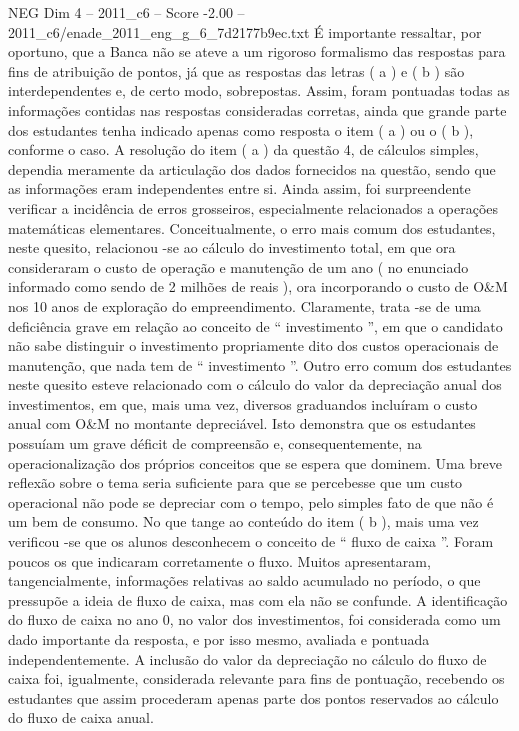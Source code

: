 \begin{textsample}{NEG Dim 4 – 2011\_c6 – Score -2.00 – 2011\_c6/enade\_2011\_eng\_g\_6\_7d2177b9ec.txt}
É importante ressaltar, por oportuno, que a Banca não se ateve a um rigoroso formalismo das respostas para fins de atribuição de pontos, já que as respostas das letras ( a ) e ( b ) são interdependentes e, de certo modo, sobrepostas.
Assim, foram pontuadas todas as informações contidas nas respostas consideradas corretas, ainda que grande parte dos estudantes tenha indicado apenas como resposta o item ( a ) ou o ( b ), conforme o caso.
A resolução do item ( a ) da questão 4, de cálculos simples, dependia meramente da articulação dos dados fornecidos na questão, sendo que as informações eram independentes entre si.
Ainda assim, foi surpreendente verificar a incidência de erros grosseiros, especialmente relacionados a operações matemáticas elementares.
Conceitualmente, o erro mais comum dos estudantes, neste quesito, relacionou -se ao cálculo do investimento total, em que ora consideraram o custo de operação e manutenção de um ano ( no enunciado informado como sendo de 2 milhões de reais ), ora incorporando o custo de O\&M nos 10 anos de exploração do empreendimento.
Claramente, trata -se de uma deficiência grave em relação ao conceito de “ investimento ”, em que o candidato não sabe distinguir o investimento propriamente dito dos custos operacionais de manutenção, que nada tem de “ investimento ”.
Outro erro comum dos estudantes neste quesito esteve relacionado com o cálculo do valor da depreciação anual dos investimentos, em que, mais uma vez, diversos graduandos incluíram o custo anual com O\&M no montante depreciável.
Isto demonstra que os estudantes possuíam um grave déficit de compreensão e, consequentemente, na operacionalização dos próprios conceitos que se espera que dominem.
Uma breve reflexão sobre o tema seria suficiente para que se percebesse que um custo operacional não pode se depreciar com o tempo, pelo simples fato de que não é um bem de consumo.
No que tange ao conteúdo do item ( b ), mais uma vez verificou -se que os alunos desconhecem o conceito de “ fluxo de caixa ”.
Foram poucos os que indicaram corretamente o fluxo.
Muitos apresentaram, tangencialmente, informações relativas ao saldo acumulado no período, o que pressupõe a ideia de fluxo de caixa, mas com ela não se confunde.
A identificação do fluxo de caixa no ano 0, no valor dos investimentos, foi considerada como um dado importante da resposta, e por isso mesmo, avaliada e pontuada independentemente.
A inclusão do valor da depreciação no cálculo do fluxo de caixa foi, igualmente, considerada relevante para fins de pontuação, recebendo os estudantes que assim procederam apenas parte dos pontos reservados ao cálculo do fluxo de caixa anual.

\end{textsample}
